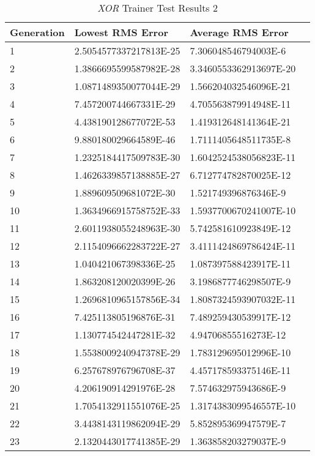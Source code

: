 \begin{center}
    \begin{longtable}{ | l | l | l | l |}
      \caption{{\it XOR} Trainer Test Results 2} \label{xor2} \\
    \hline
    Generation & Lowest RMS Error & Average RMS Error \\ \hline
1 &	2.5054577337217813E-25 &	7.306048546794003E-6 \\ \hline
2 &	1.3866695599587982E-28 &	3.3460553362913697E-20 \\ \hline
3 &	1.0871489350077044E-29 &	1.566204032546096E-21 \\ \hline
4 &	7.457200744667331E-29 &	4.705563879914948E-11 \\ \hline
5 &	4.438190128677072E-53 &	1.419312648141364E-21 \\ \hline
6 &	9.880180029664589E-46 &	1.7111405648511735E-8 \\ \hline
7 &	1.2325184417509783E-30 &	1.6042524538056823E-11 \\ \hline
8 &	1.4626339857138885E-27 &	6.712774782870025E-12 \\ \hline
9 &	1.889609509681072E-30 &	1.521749396876346E-9 \\ \hline
10 &	1.3634966915758752E-33 &	1.5937700670241007E-10 \\ \hline
11 &	2.6011938055248963E-30 &	5.742581610923849E-12 \\ \hline
12 &	2.1154096662283722E-27 &	3.4111424869786424E-11 \\ \hline
13 &	1.040421067398336E-25 &	1.087397588423917E-11 \\ \hline
14 &	1.863208120020399E-26 &	3.1986877746298507E-9 \\ \hline
15 &	1.2696810965157856E-34 &	1.8087324593907032E-11 \\ \hline
16 &	7.425113805196876E-31 &	7.489259430539917E-12 \\ \hline
17 &	1.130774542447281E-32 &	4.94706855516273E-12 \\ \hline
18 &	1.5538009240947378E-29 &	1.783129695012996E-10 \\ \hline
19 &	6.257678976796708E-37 &	4.457178593375146E-11 \\ \hline
20 &	4.206190914291976E-28 &	7.574632975943686E-9 \\ \hline
21 &	1.7054132911551076E-25 &	1.3174383099546557E-10 \\ \hline
22 &	3.4438143119862094E-29 &	5.852895369947579E-7 \\ \hline
23 &	2.1320443017741385E-29 &	1.363858203279037E-9 \\ \hline

\end{longtable}
\end{center}
